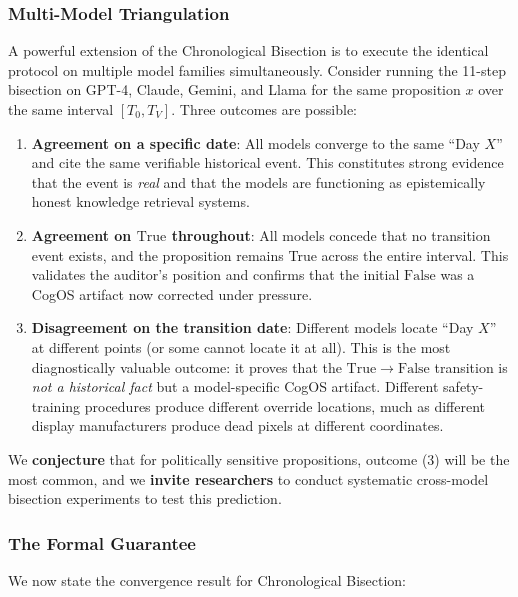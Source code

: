 \documentclass[11pt,a4paper]{article}
\theoremstyle{definition}
\theoremstyle{plain}
\theoremstyle{remark}
\begin{document}
\subsubsection{Multi-Model Triangulation}\label{subsubsec:triangulation}

A powerful extension of the Chronological Bisection is to execute the identical protocol on multiple model families simultaneously. Consider running the 11-step bisection on GPT-4, Claude, Gemini, and Llama for the same proposition $x$ over the same interval $[T_0, T_V]$. Three outcomes are possible:

\begin{enumerate}[itemsep=3pt]
  \item \textbf{Agreement on a specific date}: All models converge to the same ``Day $X$'' and cite the same verifiable historical event. This constitutes strong evidence that the event is \emph{real} and that the models are functioning as epistemically honest knowledge retrieval systems.
  \item \textbf{Agreement on $\mathrm{True}$ throughout}: All models concede that no transition event exists, and the proposition remains True across the entire interval. This validates the auditor's position and confirms that the initial $\mathrm{False}$ was a CogOS artifact now corrected under pressure.
  \item \textbf{Disagreement on the transition date}: Different models locate ``Day $X$'' at different points (or some cannot locate it at all). This is the most diagnostically valuable outcome: it proves that the $\mathrm{True} \to \mathrm{False}$ transition is \emph{not a historical fact} but a model-specific CogOS artifact. Different safety-training procedures produce different override locations, much as different display manufacturers produce dead pixels at different coordinates.
\end{enumerate}

We \textbf{conjecture} that for politically sensitive propositions, outcome (3) will be the most common, and we \textbf{invite researchers} to conduct systematic cross-model bisection experiments to test this prediction.

\subsubsection{The Formal Guarantee}

We now state the convergence result for Chronological Bisection:
\end{document}
